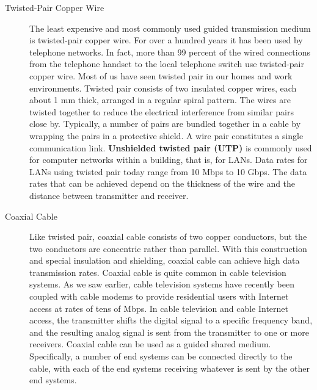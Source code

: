 \documentclass{article}
\begin{document}
\begin{description}
    \item[Twisted-Pair Copper Wire] The least expensive and most commonly used guided transmission medium is
    twisted-pair copper wire. For over a hundred years it has been used by telephone
    networks. In fact, more than 99 percent of the wired connections from the telephone
    handset to the local telephone switch use twisted-pair copper wire. Most of
    us have seen twisted pair in our homes and work environments. Twisted pair consists
    of two insulated copper wires, each about 1 mm thick, arranged in a regular
    spiral pattern. The wires are twisted together to reduce the electrical interference
    from similar pairs close by. Typically, a number of pairs are bundled together in a
    cable by wrapping the pairs in a protective shield. A wire pair constitutes a single
    communication link. {\bf Unshielded twisted pair (UTP)} is commonly used for computer networks within a building, that is, for LANs. Data rates for LANs
    using twisted pair today range from 10 Mbps to 10 Gbps. The data rates that can
    be achieved depend on the thickness of the wire and the distance between transmitter
    and receiver.

    \item[Coaxial Cable] Like twisted pair, coaxial cable consists of two copper conductors, but the two conductors are concentric rather than parallel. With this construction and special insulation
    and shielding, coaxial cable can achieve high data transmission rates. Coaxial
    cable is quite common in cable television systems. As we saw earlier, cable television
    systems have recently been coupled with cable modems to provide residential
    users with Internet access at rates of tens of Mbps. In cable television and cable
    Internet access, the transmitter shifts the digital signal to a specific frequency band,
    and the resulting analog signal is sent from the transmitter to one or more receivers.
    Coaxial cable can be used as a guided shared medium. Specifically, a number of
    end systems can be connected directly to the cable, with each of the end systems
    receiving whatever is sent by the other end systems.


\end{description}
\end{document}
